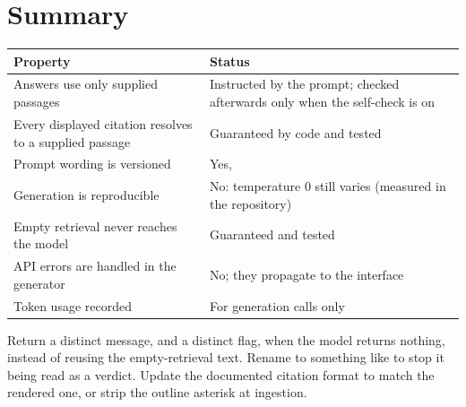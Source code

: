 \section{Summary}

\begin{center}
\begin{tabularx}{\textwidth}{@{}>{\raggedright\arraybackslash}p{6.6cm}L@{}}
\toprule
\textbf{Property} & \textbf{Status}\\
\midrule
Answers use only supplied passages & Instructed by the prompt; checked afterwards only when the self-check is on\\
Every displayed citation resolves to a supplied passage & Guaranteed by code and tested\\
Prompt wording is versioned & Yes, \\
Generation is reproducible & No: temperature 0 still varies (measured in the repository)\\
Empty retrieval never reaches the model & Guaranteed and tested\\
API errors are handled in the generator & No; they propagate to the interface\\
Token usage recorded & For generation calls only\\
\bottomrule
\end{tabularx}
\end{center}

\begin{recommended}
Return a distinct message, and a distinct flag, when the model returns nothing, instead of reusing the empty-retrieval text. Rename  to something like  to stop it being read as a verdict. Update the documented citation format to match the rendered one, or strip the outline asterisk at ingestion.
\end{recommended}
